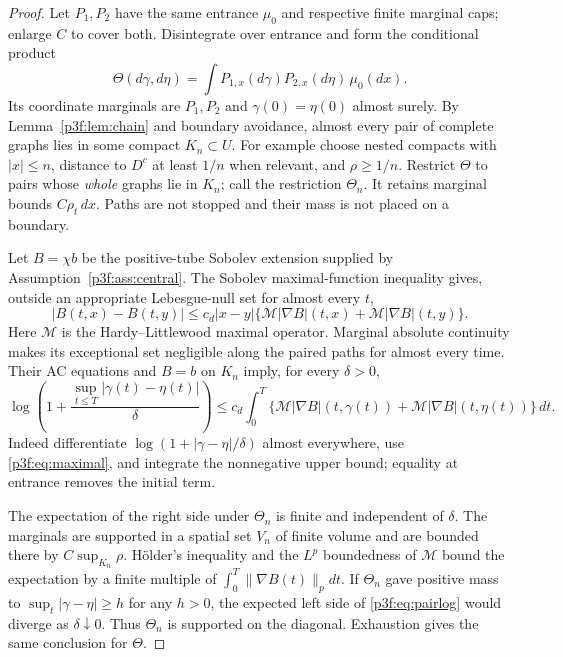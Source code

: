 \documentclass[11pt]{article}
\numberwithin{equation}{section}
\theoremstyle{definition}
\theoremstyle{remark}
\begin{document}
\begin{proof}
Let $P_1,P_2$ have the same entrance $\mu_0$ and respective finite
marginal caps; enlarge $C$ to cover both. Disintegrate over entrance
and form the conditional product
\begin{equation}\label{p3f:eq:pairlaw}
 \Theta(d\gamma,d\eta)
 =\int P_{1,x}(d\gamma)P_{2,x}(d\eta)\,\mu_0(dx).
\end{equation}
Its coordinate marginals are $P_1,P_2$ and
$\gamma(0)=\eta(0)$ almost surely. By Lemma~\ref{p3f:lem:chain} and
boundary avoidance, almost every pair of complete graphs lies in
some compact $K_n\subset U$. For example choose nested compacts
with $|x|\leq n$, distance to $D^c$ at least $1/n$ when relevant,
and $\rho\geq1/n$. Restrict $\Theta$ to pairs whose \emph{whole}
graphs lie in $K_n$; call the restriction $\Theta_n$.
It retains marginal bounds $C\rho_t\,dx$. Paths are not stopped
and their mass is not placed on a boundary.

Let $B=\chi b$ be the positive-tube Sobolev extension supplied by
Assumption~\ref{p3f:ass:central}. The Sobolev maximal-function
inequality \cite[Lemmas A.2--A.3]{CDLflow} gives, outside an
appropriate Lebesgue-null set for almost every $t$,
\begin{equation}\label{p3f:eq:maximal}
 |B(t,x)-B(t,y)|
 \leq c_d|x-y|
       \{\mathcal M|\nabla B|(t,x)+\mathcal M|\nabla B|(t,y)\}.
\end{equation}
Here $\mathcal M$ is the Hardy--Littlewood maximal operator.
Marginal absolute continuity makes its exceptional set negligible
along the paired paths for almost every time. Their AC equations and
$B=b$ on $K_n$ imply, for every $\delta>0$,
\begin{equation}\label{p3f:eq:pairlog}
 \log\!\left(1+\frac{\sup_{t\leq T}|\gamma(t)-\eta(t)|}{\delta}\right)
 \leq c_d\int_0^T
       \{\mathcal M|\nabla B|(t,\gamma(t))
          +\mathcal M|\nabla B|(t,\eta(t))\}\,dt .
\end{equation}
Indeed differentiate $\log(1+|\gamma-\eta|/\delta)$ almost
everywhere, use \eqref{p3f:eq:maximal}, and integrate the nonnegative
upper bound; equality at entrance removes the initial term.

The expectation of the right side under $\Theta_n$ is finite and
independent of $\delta$. The marginals are supported in a spatial
set $V_n$ of finite volume and are bounded there by
$C\sup_{K_n}\rho$. H\"older's inequality and the $L^p$ boundedness
of $\mathcal M$ bound the expectation by a finite multiple of
$\int_0^T\|\nabla B(t)\|_pdt$. If $\Theta_n$ gave positive mass
to $\sup_t|\gamma-\eta|\geq h$ for any $h>0$, the expected
left side of \eqref{p3f:eq:pairlog} would diverge as
$\delta\downarrow0$. Thus $\Theta_n$ is supported on the diagonal.
Exhaustion gives the same conclusion for $\Theta$.


\end{proof}
\end{document}

